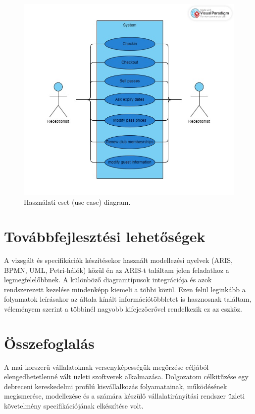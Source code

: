 \documentclass[12pt]{article}
\begin{document}
\begin{figure}
\includegraphics[width=\textwidth]{usecase}
\caption{Használati eset (use case) diagram. }
\end{figure}


\newpage
\section{Továbbfejlesztési lehetőségek}

A vizsgált és specifikációk készítésekor használt modellezési nyelvek (ARIS, BPMN, UML, Petri-hálók) közül én az ARIS-t találtam jelen feladathoz a legmegfelelőbbnek. A különböző diagramtípusok integrációja és azok rendszerezett kezelése mindenképp kiemeli a többi közül. Ezen felül leginkább a folyamatok leírásakor az általa kínált információtöbbletet is hasznosnak találtam, véleményem szerint a többinél nagyobb kifejezőerővel rendelkezik ez az eszköz. 

\newpage
\section*{Összefoglalás}

A mai korszerű vállalatoknak versenyképességük megőrzése céljából elengedhetetlenné vált üzleti szoftverek alkalmazása. Dolgozatom célkitűzése egy debreceni kereskedelmi profilú kisvállalkozás folyamatainak, működésének megismerése, modellezése és a számára készülő vállalatirányítási rendszer üzleti követelmény specifikációjának elkészítése volt. 
\end{document}
